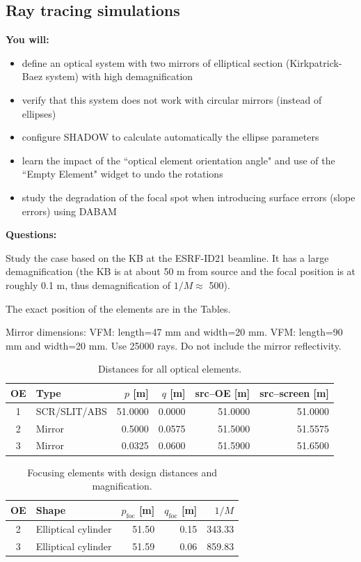 \subsection{Ray tracing simulations}

\textbf{You will:}

\begin{itemize}
    \item define an optical system with two mirrors of elliptical section (Kirkpatrick-Baez system) with high demagnification
    \item verify that this system does not work with circular mirrors (instead of ellipses)
    \item configure SHADOW to calculate automatically the ellipse parameters
    \item learn the impact of the ``optical element orientation angle" and use of the ``Empty Element" widget to undo the rotations
    \item study the degradation of the focal spot when introducing surface errors (slope errors) using DABAM
\end{itemize}

\textbf{Questions:}

Study the case based on the KB at the ESRF-ID21 beamline. 
It has a large demagnification (the KB is at about 50 m from source and the focal position is at roughly 0.1 m, thus demagnification of $1/M\approx$ 500).

The exact position of the elements are in the Tables.

Mirror dimensions: VFM: length=47 mm and width=20 mm. VFM: length=90 mm and width=20 mm. Use 25000 rays. Do not include the mirror reflectivity.


\begin{table}[h]
\caption{Distances for all optical elements.}
\centering
\begin{tabular}{clrrrr}
    \hline
    OE & Type & $p$ [m] & $q$ [m] & src--OE [m] & src--screen [m] \\
    \hline
    1 & SCR/SLIT/ABS &  51.0000 & 0.0000 & 51.0000 & 51.0000 \\
    2 & Mirror       &   0.5000 & 0.0575 & 51.5000 & 51.5575 \\
    3 & Mirror       &   0.0325 & 0.0600 & 51.5900 & 51.6500 \\
    \hline
\end{tabular}
\end{table}

\begin{table}[h]
\caption{Focusing elements with design distances and magnification.}
\centering
\begin{tabular}{clrrr}
    \hline
    OE & Shape & $p_\mathrm{foc}$ [m] & $q_\mathrm{foc}$ [m] & $1/M$ \\
    \hline
    2 & Elliptical cylinder & 51.50 & 0.15 & 343.33 \\
    3 & Elliptical cylinder & 51.59 & 0.06 & 859.83 \\
    \hline
\end{tabular}
\end{table}


